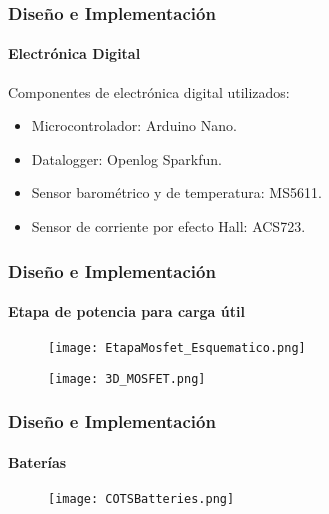 
\begin{frame}
\frametitle{Diseño e Implementación}
\framesubtitle{Electrónica Digital}
Componentes de electrónica digital utilizados:
\begin{itemize}
    \item Microcontrolador: Arduino Nano.
    \item Datalogger: Openlog Sparkfun.
    \item Sensor barométrico y de temperatura: MS5611.
    \item Sensor de corriente por efecto Hall: ACS723.
\end{itemize}
\end{frame}



\begin{frame}
    \frametitle{Diseño e Implementación}
    \framesubtitle{Etapa de potencia para carga útil}
    \vfill
    \begin{figure}
        \centering
        \begin{minipage}{.5\textwidth}
            \centering
            \texttt{[image: EtapaMosfet\_Esquematico.png]} %
            \label{fig:ESQMOSFET}
        \end{minipage}\hfill
        \begin{minipage}{.5\textwidth}
            \centering
            \texttt{[image: 3D\_MOSFET.png]} %
            \label{fig:PCBMOSFET}
        \end{minipage}
    \end{figure} 
\end{frame}


\begin{frame}
    \frametitle{Diseño e Implementación}
    \framesubtitle{Baterías}
    \begin{figure}[H]
        \centering
        \texttt{[image: COTSBatteries.png]} %
        \label{fig:COTSBatt}
    \end{figure}
    

\end{frame}


